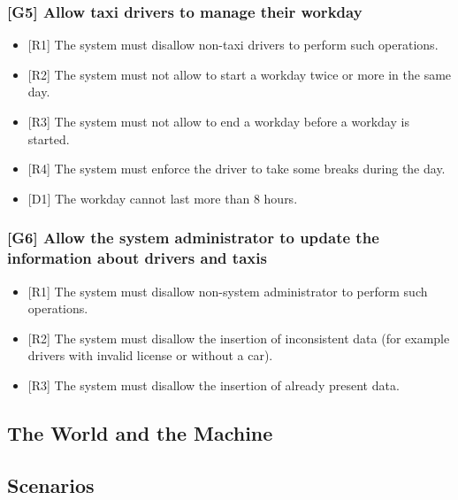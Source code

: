 \documentclass[a4paper,12pt]{article}%
\begin{document}
\subsubsection{{[}G5{]} Allow taxi drivers to manage their workday}
\begin{itemize}
\item {[}R1{]} The system must disallow non-taxi drivers to perform such operations.
\item {[}R2{]} The system must not allow to start a workday twice or more in the same day.
\item {[}R3{]} The system must not allow to end a workday before a workday is started.
\item {[}R4{]} The system must enforce the driver to take some breaks during the day.
\item {[}D1{]} The workday cannot last more than 8 hours.
\end{itemize}
\label{goal5}
\subsubsection{{[}G6{]} Allow the system administrator to update the information about drivers and taxis}
\begin{itemize}
\item {[}R1{]} The system must disallow non-system administrator to perform such operations.
\item {[}R2{]} The system must disallow the insertion of inconsistent data (for example drivers with invalid license or without a car).
\item {[}R3{]} The system must disallow the insertion of already present data.
\end{itemize}
\label{goal6}
\subsection{The World and the Machine}
\subsection{Scenarios}
\end{document}
